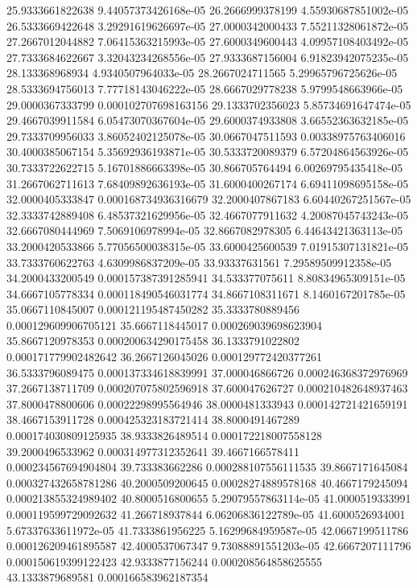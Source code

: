 {25.9333661822638 9.44057373426168e-05
26.2666999378199 4.55930687851002e-05
26.5333669422648 3.29291619626697e-05
27.0000342000433 7.55211328061872e-05
27.2667012044882 7.06415363215993e-05
27.6000349600443 4.09957108403492e-05
27.7333684622667 3.32043234268556e-05
27.9333687156004 6.91823942075235e-05
28.133368968934 4.9340507964033e-05
28.2667024711565 5.29965796725626e-05
28.5333694756013 7.77718143046222e-05
28.6667029778238 5.9799548663966e-05
29.0000367333799 0.000102707698163156
29.1333702356023 5.85734691647474e-05
29.4667039911584 6.05473070367604e-05
29.6000374933808 3.66552363632185e-05
29.7333709956033 3.86052402125078e-05
30.0667047511593 0.00338975763406016
30.4000385067154 5.35692936193871e-05
30.5333720089379 6.57204864563926e-05
30.7333722622715 5.16701886663398e-05
30.866705764494 6.00269795435418e-05
31.2667062711613 7.68409892636193e-05
31.6000400267174 6.69411098695158e-05
32.0000405333847 0.000168734936316679
32.2000407867183 6.60440267251567e-05
32.3333742889408 6.48537321629956e-05
32.4667077911632 4.20087045743243e-05
32.6667080444969 7.5069106978994e-05
32.8667082978305 6.44643421363113e-05
33.2000420533866 5.77056500038315e-05
33.6000425600539 7.01915307131821e-05
33.7333760622763 4.6309986837209e-05
33.93337631561 7.29589509912358e-05
34.2000433200549 0.000157387391285941
34.533377075611 8.80834965309151e-05
34.6667105778334 0.000118490546031774
34.8667108311671 8.1460167201785e-05
35.0667110845007 0.000121195487450282
35.3333780889456 0.000129609906705121
35.6667118445017 0.000269039698623904
35.8667120978353 0.000200634290175458
36.1333791022802 0.000171779902482642
36.2667126045026 0.000129772420377261
36.5333796089475 0.000137334618839991
37.000046866726 0.000246368372976969
37.2667138711709 0.000207075802596918
37.600047626727 0.000210482648937463
37.8000478800606 0.00022298995564946
38.0000481333943 0.000142721421659191
38.4667153911728 0.000425323183721414
38.8000491467289 0.000174030809125935
38.9333826489514 0.000172218007558128
39.2000496533962 0.000314977312352641
39.4667166578411 0.000234567694904804
39.733383662286 0.000288107556111535
39.8667171645084 0.000327432658781286
40.2000509200645 0.00028274889578168
40.4667179245094 0.000213855324989402
40.8000516800655 5.29079557863114e-05
41.0000519333991 0.000119599729092632
41.266718937844 6.06206836122789e-05
41.6000526934001 5.67337633611972e-05
41.7333861956225 5.16299684959587e-05
42.0667199511786 0.000126209461895587
42.4000537067347 9.73088891551203e-05
42.6667207111796 0.000150619399122423
42.9333877156244 0.000208564858625555
43.1333879689581 0.000166583962187354
}
